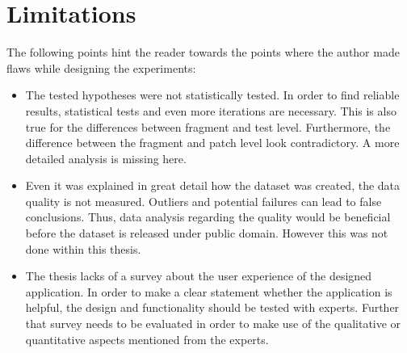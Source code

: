 \section{Limitations}
The following points hint the reader towards the points where the author made flaws while designing the experiments:
\begin{itemize}
	\item The tested hypotheses were not statistically tested. In order to find reliable results, statistical tests and even more iterations are necessary. This is also true for the differences between fragment and test level. Furthermore, the difference between the fragment and patch level look contradictory. A more detailed analysis is missing here.
	\item \noindent Even it was explained in great detail how the dataset was created, the data quality is not measured. Outliers and potential failures can lead to false conclusions. Thus, data analysis regarding the quality would be beneficial before the dataset is released under public domain. However this was not done within this thesis. 
	\item The thesis lacks of a survey about the user experience of the designed application. In order to make a clear statement whether the application is helpful, the design and functionality should be tested with experts. Further that survey needs to be evaluated in order to make use of the qualitative or quantitative aspects mentioned from the experts. 
\end{itemize}
%
